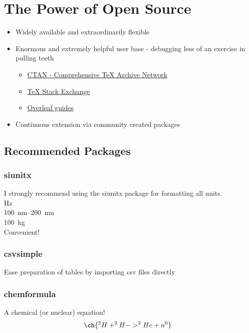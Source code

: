 \documentclass[titlepage, hidelinks, 12pt]{article}%
\begin{document}
    \section{The Power of Open Source}
        \begin{itemize}
            \item Widely available and extraordinarily flexible
            \item Enormous and extremely helpful user base - debugging less of an exercise in pulling teeth
                \begin{itemize}
                    \item \href{https://www.ctan.org/}{CTAN - Comprehensive TeX Archive Network}
                    \item \href{https://tex.stackexchange.com/}{TeX Stack Exchange}
                    \item \href{https://www.overleaf.com/learn}{Overleaf guides}
                \end{itemize}
            \item Continuous extension via community created packages
        \end{itemize}

        \subsection{Recommended Packages}
            \subsubsection{siunitx}
                I strongly recommend using the siunitx package for formatting all units.
                \\\si{\hertz}
                \\\SIrange{100}{200}{\nano\meter}
                \\\SI{100}{\kilo\gram}
                \\Convenient!

            \subsubsection{csvsimple}
                Ease preparation of tables by importing csv files directly

            \subsubsection{chemformula}
                A chemical (or nuclear) equation!
                \begin{equation}
                    \ch{
                    ^{2}H + ^{2}H -> ^{3}He + n^{0}
                    }
                    \label{eqt:nucEnerReleased}
                \end{equation}
\end{document}
